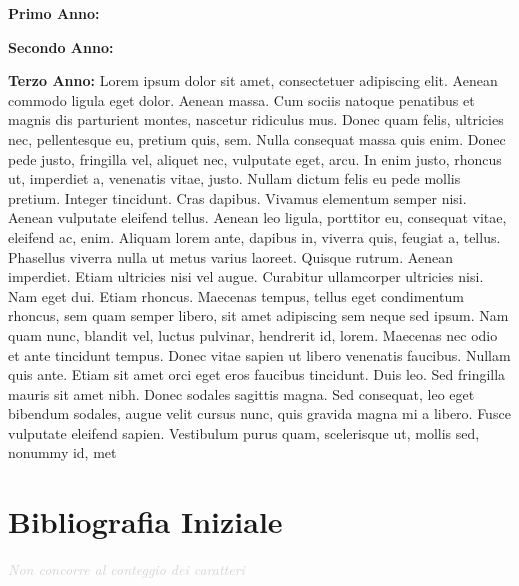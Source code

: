\documentclass[a4paper,12pt]{article}
\begin{document}
\textbf{Primo Anno:}

\textbf{Secondo Anno:}

\textbf{Terzo Anno:}
Lorem ipsum dolor sit amet, consectetuer adipiscing elit. Aenean commodo ligula eget dolor. Aenean massa. Cum sociis natoque penatibus et magnis dis parturient montes, nascetur ridiculus mus. Donec quam felis, ultricies nec, pellentesque eu, pretium quis, sem. Nulla consequat massa quis enim. Donec pede justo, fringilla vel, aliquet nec, vulputate eget, arcu. In enim justo, rhoncus ut, imperdiet a, venenatis vitae, justo. Nullam dictum felis eu pede mollis pretium. Integer tincidunt. Cras dapibus. Vivamus elementum semper nisi. Aenean vulputate eleifend tellus. Aenean leo ligula, porttitor eu, consequat vitae, eleifend ac, enim. Aliquam lorem ante, dapibus in, viverra quis, feugiat a, tellus. Phasellus viverra nulla ut metus varius laoreet. Quisque rutrum. Aenean imperdiet. Etiam ultricies nisi vel augue. Curabitur ullamcorper ultricies nisi. Nam eget dui. Etiam rhoncus. Maecenas tempus, tellus eget condimentum rhoncus, sem quam semper libero, sit amet adipiscing sem neque sed ipsum. Nam quam nunc, blandit vel, luctus pulvinar, hendrerit id, lorem. Maecenas nec odio et ante tincidunt tempus. Donec vitae sapien ut libero venenatis faucibus. Nullam quis ante. Etiam sit amet orci eget eros faucibus tincidunt. Duis leo. Sed fringilla mauris sit amet nibh. Donec sodales sagittis magna. Sed consequat, leo eget bibendum sodales, augue velit cursus nunc, quis gravida magna mi a libero. Fusce vulputate eleifend sapien. Vestibulum purus quam, scelerisque ut, mollis sed, nonummy id, met


\newpage

\section*{Bibliografia Iniziale}
{\small\textcolor{lightgray}{\textit{Non concorre al conteggio dei caratteri}}}
\end{document}
